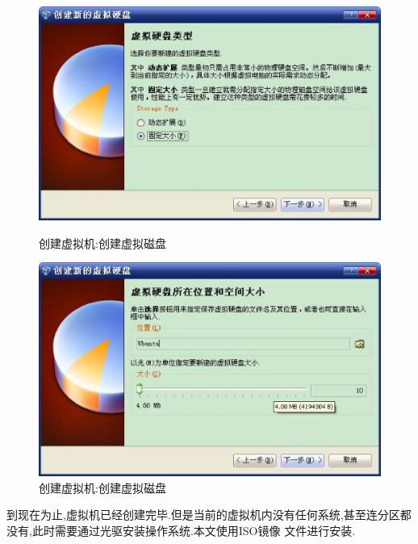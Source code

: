 \documentclass[12pt,a4paper]{article}
\begin{document}
\begin{figure}[!bthp]
\includegraphics[width=1\textwidth]{pic/f_create_vb_hdisk1.eps}
\caption{创建虚拟机:创建虚拟磁盘}
\includegraphics[width=1\textwidth]{pic/f_create_vb_hdisk2.eps}
\caption{创建虚拟机:创建虚拟磁盘}
\end{figure}
\newpage
到现在为止,虚拟机已经创建完毕.但是当前的虚拟机内没有任何系统,甚至连分区都没有,此时需要通过光驱安装操作系统.本文使用ISO镜像
文件进行安装.
\end{document}

